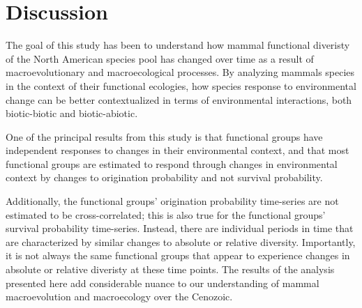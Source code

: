 \documentclass[12pt,letterpaper]{article}
\begin{document}
\section*{Discussion}



The goal of this study has been to understand how mammal functional diveristy of the North American species pool has changed over time as a result of macroevolutionary and macroecological processes. By analyzing mammals species in the context of their functional ecologies, how species response to environmental change can be better contextualized in terms of environmental interactions, both biotic-biotic and biotic-abiotic. 

One of the principal results from this study is that functional groups have independent responses to changes in their environmental context, and that most functional groups are estimated to respond through changes in environmental context by changes to origination probability and not survival probability. 

Additionally, the functional groups' origination probability time-series are not estimated to be cross-correlated; this is also true for the functional groups' survival probability time-series. Instead, there are individual periods in time that are characterized by similar changes to absolute or relative diversity. Importantly, it is not always the same functional groups that appear to experience changes in absolute or relative diveristy at these time points. The results of the analysis presented here add considerable nuance to our understanding of mammal macroevolution and macroecology over the Cenozoic. 
\end{document}
